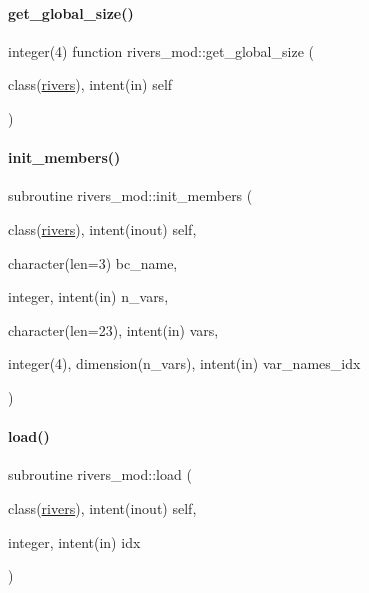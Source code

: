 \paragraph{\texorpdfstring{get\+\_\+global\+\_\+size()}{get\_global\_size()}}
{\footnotesize\ttfamily integer(4) function rivers\+\_\+mod\+::get\+\_\+global\+\_\+size (\begin{DoxyParamCaption}\item[{class(\mbox{\hyperlink{structrivers__mod_1_1rivers}{rivers}}), intent(in)}]{self }\end{DoxyParamCaption})\hspace{0.3cm}{\ttfamily [private]}}

\mbox{\label{namespacerivers__mod_a59adda30a3e127948ece594ab4fd18a0}} 
\paragraph{\texorpdfstring{init\+\_\+members()}{init\_members()}}
{\footnotesize\ttfamily subroutine rivers\+\_\+mod\+::init\+\_\+members (\begin{DoxyParamCaption}\item[{class(\mbox{\hyperlink{structrivers__mod_1_1rivers}{rivers}}), intent(inout)}]{self,  }\item[{character(len=3)}]{bc\+\_\+name,  }\item[{integer, intent(in)}]{n\+\_\+vars,  }\item[{character(len=23), intent(in)}]{vars,  }\item[{integer(4), dimension(n\+\_\+vars), intent(in)}]{var\+\_\+names\+\_\+idx }\end{DoxyParamCaption})\hspace{0.3cm}{\ttfamily [private]}}

\mbox{\label{namespacerivers__mod_ad86f8407065f8e1beffbd06052d05eea}} 
\paragraph{\texorpdfstring{load()}{load()}}
{\footnotesize\ttfamily subroutine rivers\+\_\+mod\+::load (\begin{DoxyParamCaption}\item[{class(\mbox{\hyperlink{structrivers__mod_1_1rivers}{rivers}}), intent(inout)}]{self,  }\item[{integer, intent(in)}]{idx }\end{DoxyParamCaption})\hspace{0.3cm}{\ttfamily [private]}}

